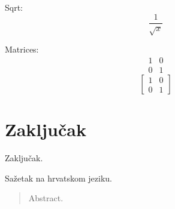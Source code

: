 \documentclass[times, utf8, diplomski]{fer}
\begin{document}
Sqrt:
\begin{equation*}
  \frac{1}{\sqrt{x}}
\end{equation*}

Matrices:
\begin{equation*}
  \begin{matrix}
  1 & 0\\
  0 & 1
  \end{matrix}
\end{equation*}
\begin{equation*}
\left[
  \begin{matrix}
  1 & 0\\
  0 & 1
  \end{matrix}
\right]
\end{equation*}

\chapter{Zaključak}
Zaključak.




\begin{sazetak}
Sažetak na hrvatskom jeziku.

\end{sazetak}

\begin{abstract}
Abstract.

\end{abstract}
\end{document}
